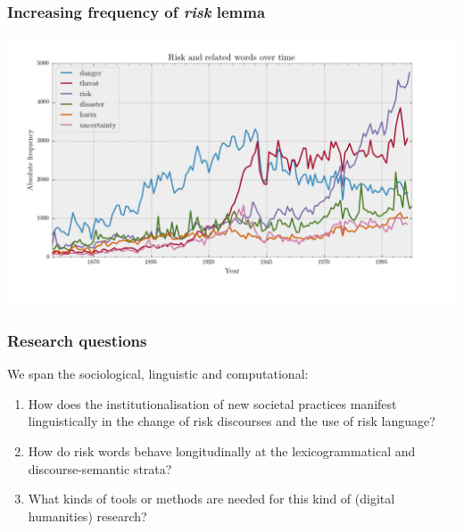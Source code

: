 \documentclass{beamer}       %
\begin{document}
\begin{frame}
    \frametitle{Increasing frequency of \emph{risk} lemma}
    \centering
    \includegraphics[width=1\textwidth]{../../images/risk_related_june_colour}
\end{frame}

\begin{frame}
    \frametitle{Research questions}

    We span the sociological, linguistic and computational:

    \begin{enumerate}
        \item How does the institutionalisation of new societal practices manifest linguistically in the change of risk discourses and the use of risk language?
        \item How do risk words behave longitudinally at the lexicogrammatical and discourse-semantic strata?
        \item What kinds of tools or methods are needed for this kind of (digital humanities) research?
    \end{enumerate}
\end{frame}
\end{document}
